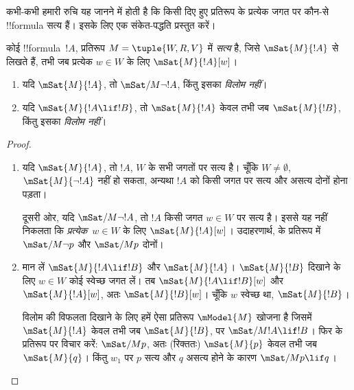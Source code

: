 \documentclass[../../../include/open-logic-section]{subfiles}
\begin{document}


कभी-कभी हमारी रुचि यह जानने में होती है कि किसी दिए हुए प्रतिरूप के प्रत्येक
जगत पर कौन-से !!{formula} सत्य हैं। इसके लिए एक संकेत-पद्धति प्रस्तुत करें।

\begin{defn}
  कोई !!{formula}~$!A$, प्रतिरूप $M = \tuple{W, R, V}$ में \emph{सत्य} है,
  जिसे $\mSat{M}{!A}$ से लिखते हैं, तभी जब प्रत्येक $w \in W$ के लिए
  $\mSat{M}{!A}[w]$।
\end{defn}

\begin{prop}
  \begin{enumerate}
  \item यदि $\mSat{M}{!A}$, तो $\mSat/{M}{\lnot !A}$, किंतु इसका
    \emph{विलोम नहीं}।
  \item यदि $\mSat{M}{!A \lif !B}$, तो $\mSat{M}{!A}$ केवल तभी जब
    $\mSat{M}{!B}$, किंतु इसका \emph{विलोम नहीं}।
  \end{enumerate}
\end{prop}

\begin{proof}
  \begin{enumerate}
  \item यदि $\mSat{M}{!A}$, तो $!A$, $W$ के सभी जगतों पर सत्य है। चूँकि
    $W \neq \emptyset$, $\mSat{M}{\lnot!A}$ नहीं हो सकता, अन्यथा $!A$ को
    किसी जगत पर सत्य और असत्य दोनों होना पड़ता।

    दूसरी ओर, यदि $\mSat/{M}{\lnot !A}$, तो $!A$ किसी जगत $w \in W$ पर
    सत्य है। इससे यह नहीं निकलता कि \emph{प्रत्येक}~$w \in W$ के लिए
    $\mSat{M}{!A}[w]$। उदाहरणार्थ,  के प्रतिरूप में
    $\mSat/{M}{\lnot p}$ और $\mSat/{M}{p}$ दोनों।
  \item मान लें $\mSat{M}{!A \lif !B}$ और $\mSat{M}{!A}$।
    $\mSat{M}{!B}$ दिखाने के लिए $w \in W$ कोई स्वेच्छ जगत लें। तब
    $\mSat{M}{!A \lif !B}[w]$ और $\mSat{M}{!A}[w]$, अतः
    $\mSat{M}{!B}[w]$। चूँकि $w$ स्वेच्छ था, $\mSat{M}{!B}$।

    विलोम की विफलता दिखाने के लिए हमें ऐसा प्रतिरूप $\mModel{M}$ खोजना है
    जिसमें $\mSat{M}{!A}$ केवल तभी जब $\mSat{M}{!B}$, पर
    $\mSat/{M}{!A \lif !B}$। फिर  के प्रतिरूप पर
    विचार करें: $\mSat/{M}{p}$, अतः (रिक्ततः) $\mSat{M}{p}$ केवल तभी जब
    $\mSat{M}{q}$। किंतु $w_1$ पर $p$ सत्य और $q$ असत्य होने के कारण
    $\mSat/{M}{p \lif q}$।
  \end{enumerate}
\end{proof}
\end{document}
